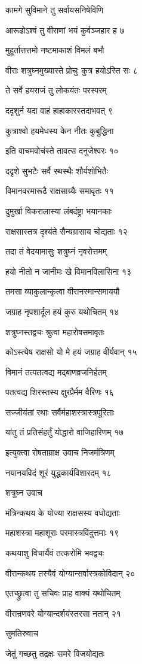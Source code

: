 कामगे सुविमाने तु सर्वायसनिषेविणि

आरूढोऽश्वं तु वीराणां भयं कुर्वञ्जहार ह ७

मुहूर्तात्तत्तमो नष्टमाकाशं विमलं बभौ

वीराः शत्रुघ्नमुख्यास्ते प्रोचुः कुत्र हयोऽस्ति सः ८

ते सर्वे हयराजं तु लोकयंतः परस्परम्

ददृशुर्न यदा वाहं हाहाकारस्तदाभवत् ९

कुत्राश्वो हयमेधस्य केन नीतः कुबुद्धिना

इति वाचमवोचंस्ते तावत्स दनुजेश्वरः १०

ददृशे सुभटैः सर्वै रथस्थैः शौर्यशोभितैः

विमानवरमारूढै राक्षसाग्र्यैः समावृतः ११

दुमुर्खा विकरालास्या लंबदंष्ट्रा भयानकाः

राक्षसास्तत्र दृश्यंते सैन्यग्रासाय चोद्यताः १२

तदा तं वेदयामासुः शत्रुघ्नं नृवरोत्तमम्

हयो नीतो न जानीमः खे विमानविलासिना १३

तमसा व्याकुलान्कृत्वा वीरानस्मान्समाययौ

जग्राह नृपशार्दूल हयं कुरु यथोचितम् १४

शत्रुघ्नस्तद्वचः श्रुत्वा महारोषसमावृतः

कोऽस्त्येष राक्षसो यो मे हयं जग्राह वीर्यवान् १५

विमानं तत्पतत्वद्य मद्बाणव्रजनिर्हतम्

पतत्वद्य शिरस्तस्य क्षुरप्रैर्मम वैरिणः १६

सज्जीयंतां रथाः सर्वैर्महाशस्त्रास्त्रपूरिताः

यांतु तं प्रतिसंहर्तुं योद्धारो वाजिहारिणम् १७

इत्युक्त्वा रोषताम्राक्ष उवाच निजमंत्रिणम्

नयानयविदं शूरं युद्धकार्यविशारदम् १८

शत्रुघ्न उवाच

मंत्रिन्कथय के योज्या राक्षसस्य वधोद्यताः

महाशस्त्रा महाशूराः परमास्त्रविदुत्तमाः १९

कथयाशु विचार्यैवं तत्करोमि भवद्वचः

वीरान्कथय तस्यैवं योग्यान्सर्वास्त्रकोविदान् २०

एतच्छ्रुत्वा तु सचिवः प्राह वाक्यं यथोचितम्

वीरान्रणवरे योग्यान्दर्शयंस्तरसा नतान् २१

सुमतिरुवाच

जेतुं गच्छतु तद्रक्षः समरे विजयोद्यतः

